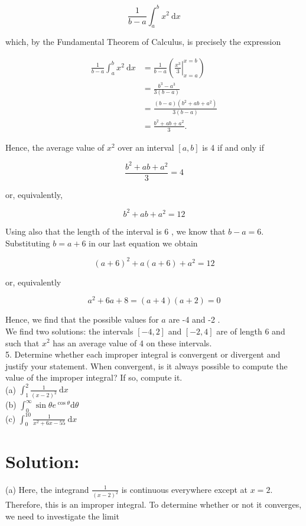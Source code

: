 \documentclass[10pt]{article}
\begin{document}
$$
\frac{1}{b-a} \int_{a}^{b} x^{2} \mathrm{~d} x
$$

which, by the Fundamental Theorem of Calculus, is precisely the expression

$$
\begin{aligned}
\frac{1}{b-a} \int_{a}^{b} x^{2} \mathrm{~d} x & =\frac{1}{b-a}\left(\left.\frac{x^{3}}{3}\right|_{x=a} ^{x=b}\right) \\
& =\frac{b^{3}-a^{3}}{3(b-a)} \\
& =\frac{(b-a)\left(b^{2}+a b+a^{2}\right)}{3(b-a)} \\
& =\frac{b^{2}+a b+a^{2}}{3} .
\end{aligned}
$$

Hence, the average value of $x^{2}$ over an interval $[a, b]$ is 4 if and only if

$$
\frac{b^{2}+a b+a^{2}}{3}=4
$$

or, equivalently,

$$
b^{2}+a b+a^{2}=12
$$

Using also that the length of the interval is 6 , we know that $b-a=6$. Substituting $b=a+6$ in our last equation we obtain

$$
(a+6)^{2}+a(a+6)+a^{2}=12
$$

or, equivalently

$$
a^{2}+6 a+8=(a+4)(a+2)=0
$$

Hence, we find that the possible values for $a$ are -4 and -2 .\\
We find two solutions: the intervals $[-4,2]$ and $[-2,4]$ are of length 6 and such that $x^{2}$ has an average value of 4 on these intervals.\\
5. Determine whether each improper integral is convergent or divergent and justify your statement. When convergent, is it always possible to compute the value of the improper integral? If so, compute it.\\
(a) $\int_{1}^{2} \frac{1}{(x-2)^{2}} \mathrm{~d} x$\\
(b) $\int_{0}^{\infty} \sin \theta e^{\cos \theta} \mathrm{d} \theta$\\
(c) $\int_{0}^{10} \frac{1}{x^{2}+6 x-55} \mathrm{~d} x$

\section*{Solution:}
(a) Here, the integrand $\frac{1}{(x-2)^{2}}$ is continuous everywhere except at $x=2$. Therefore, this is an improper integral. To determine whether or not it converges, we need to investigate the limit
\end{document}
